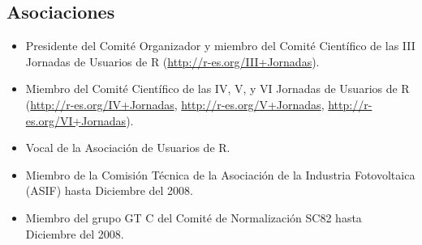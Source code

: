 \documentclass[article, a4paper]{memoir}
\begin{document}
\subsection{Asociaciones}
\label{sec:orgb2805f5}

\begin{itemize}
\item Presidente del Comité Organizador y miembro del Comité Científico de las III Jornadas de Usuarios de R (\url{http://r-es.org/III+Jornadas}).

\item Miembro del Comité Científico de las IV, V, y VI Jornadas de Usuarios de R (\url{http://r-es.org/IV+Jornadas}, \url{http://r-es.org/V+Jornadas}, \url{http://r-es.org/VI+Jornadas}).

\item Vocal de la Asociación de Usuarios de R.

\item Miembro de la Comisión Técnica de la Asociación de la Industria Fotovoltaica (ASIF) hasta Diciembre del 2008.

\item Miembro del grupo GT C del Comité de Normalización SC82 hasta Diciembre del 2008.
\end{itemize}
\end{document}
